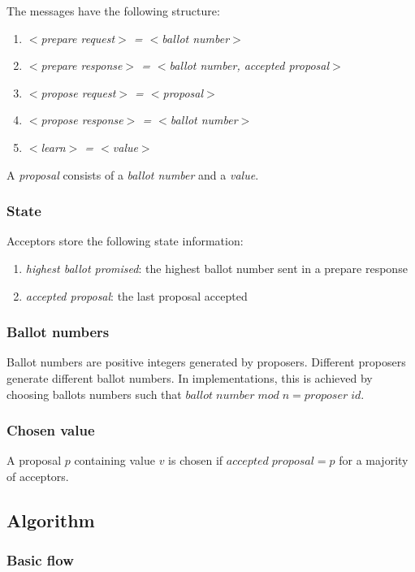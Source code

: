 \documentclass[12pt]{amsart}
\begin{document}
The messages have the following structure:
\begin{enumerate}
\item \emph{$<$prepare request$>$ = $<$ballot number$>$}
\item \emph{$<$prepare response$>$ = $<$ballot number, accepted proposal$>$}
\item \emph{$<$propose request$>$ = $<$proposal$>$}
\item \emph{$<$propose response$>$ = $<$ballot number$>$}
\item \emph{$<$learn$>$ = $<$value$>$}
\end{enumerate}

A \emph{proposal} consists of a \emph{ballot number} and a \emph{value}.

\subsubsection{ State }
Acceptors store the following state information:
\begin{enumerate}
\item \emph{highest ballot promised}: the highest ballot number sent in a prepare response
\item \emph{accepted proposal}: the last proposal accepted
\end{enumerate}

\subsubsection{ Ballot numbers }
Ballot numbers are positive integers generated by proposers. Different proposers generate different ballot numbers. In implementations, this is achieved by choosing ballots numbers such that
$ballot \; number \; mod \; n = proposer \; id$.

\subsubsection{ Chosen value }
A proposal $p$ containing value $v$ is chosen if $ accepted \; proposal = p $ for a majority of acceptors.

\subsection{ Algorithm }

\subsubsection{ Basic flow }
\end{document}
